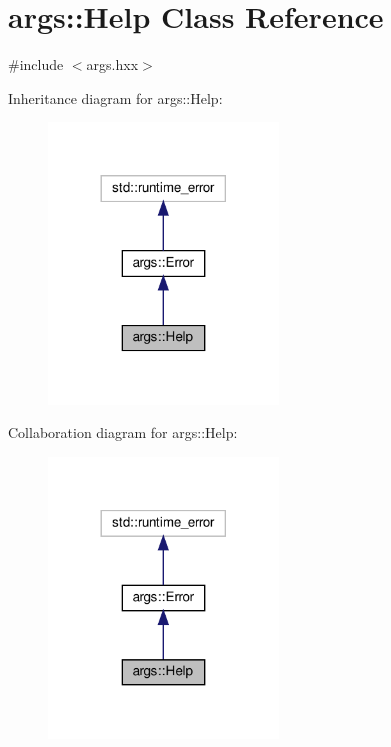 \hypertarget{classargs_1_1_help}{}\section{args\+:\+:Help Class Reference}
\label{classargs_1_1_help}


{\ttfamily \#include $<$args.\+hxx$>$}



Inheritance diagram for args\+:\+:Help\+:\nopagebreak
\begin{figure}[H]
\begin{center}
\leavevmode
\includegraphics[width=173pt]{classargs_1_1_help__inherit__graph}
\end{center}
\end{figure}


Collaboration diagram for args\+:\+:Help\+:\nopagebreak
\begin{figure}[H]
\begin{center}
\leavevmode
\includegraphics[width=173pt]{classargs_1_1_help__coll__graph}
\end{center}
\end{figure}
